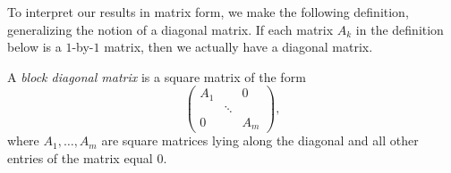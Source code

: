 %
To interpret our results in matrix form, we make the following definition,
generalizing the notion of a diagonal matrix. If each matrix $A_k$ in the
definition below is a $1$-by-$1$ matrix, then we actually have a diagonal
matrix.

\begin{definition}\label{ax:8.35}
A \emph{block diagonal matrix} is a square matrix of the form
\[ \begin{pmatrix} A_1 & & 0\\ & \ddots & \\ 0 & & A_m \end{pmatrix}, \]
where $A_1,\dots,A_m$ are square matrices lying along the diagonal and all
other entries of the matrix equal $0$.
\end{definition}

